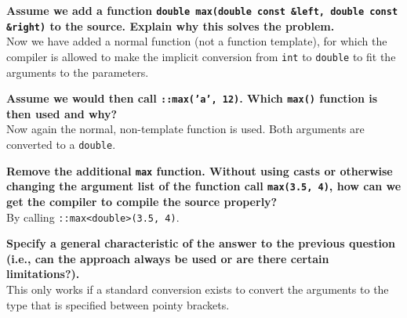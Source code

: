 \documentclass[12pt]{article}
\begin{document}
\textbf{Assume we add a function 
\texttt{double max(double const \&left, double const \&right)}
to the source. Explain why this solves the problem.}\\
Now we have added a normal function (not a function template), for which the compiler is allowed to make the implicit conversion from \texttt{int} to \texttt{double} to fit the arguments to the parameters.

\textbf{Assume we would then call \texttt{::max('a', 12)}. Which \texttt{max()} function is then used and why? }\\
Now again the normal, non-template function is used. Both arguments are converted to a \texttt{double}.

\textbf{Remove the additional \texttt{max} function. Without using casts or otherwise changing the argument list of the function call \texttt{max(3.5, 4)}, how can we get the compiler to compile the source properly? }\\
By calling \texttt{::max<double>(3.5, 4)}.

\textbf{Specify a general characteristic of the answer to the previous question (i.e., can the approach always be used or are there certain limitations?). }\\
This only works if a standard conversion exists to convert the arguments to the type that is specified between pointy brackets. 







\clearpage
\end{document}
